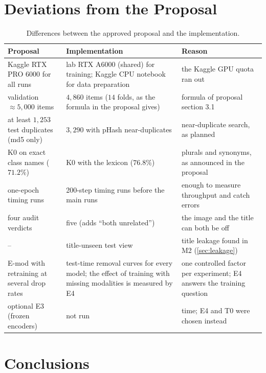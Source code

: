 \section{Deviations from the Proposal}
\label{sec:deviations}

\begin{table}[H]
  \centering\small
  \caption{Differences between the approved proposal and the implementation.}
  \begin{tabularx}{\linewidth}{@{}YYY@{}}
    \toprule
    Proposal & Implementation & Reason \\
    \midrule
    Kaggle RTX PRO 6000 for all runs & lab RTX A6000 (shared) for training; Kaggle CPU notebook for data preparation & the Kaggle GPU quota ran out \\
    validation $\approx 5{,}000$ items & $4{,}860$ items ($14$ folds, as the formula in the proposal gives) & formula of proposal section 3.1 \\
    at least $1{,}253$ test duplicates (md5 only) & $3{,}290$ with pHash near-duplicates & near-duplicate search, as planned \\
    K0 on exact class names ($71.2\%$) & K0 with the lexicon ($76.8\%$) & plurals and synonyms, as announced in the proposal \\
    one-epoch timing runs & 200-step timing runs before the main runs & enough to measure throughput and catch errors \\
    four audit verdicts & five (adds ``both unrelated'') & the image and the title can both be off \\
    -- & title-unseen test view & title leakage found in M2 (\cref{sec:leakage}) \\
    E-mod with retraining at several drop rates & test-time removal curves for every model; the effect of training with missing modalities is measured by E4 & one controlled factor per experiment; E4 answers the training question \\
    optional E3 (frozen encoders) & not run & time; E4 and T0 were chosen instead \\
    \bottomrule
  \end{tabularx}
\end{table}

\section{Conclusions}
\label{sec:conclusions}

